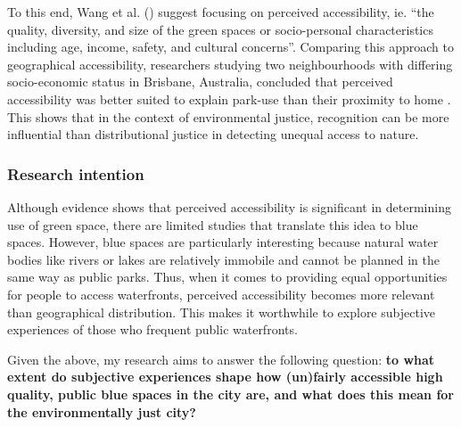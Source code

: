 \documentclass{article}
\begin{document}
To this end, Wang et al. (\citeyear{wang2015physical}) suggest focusing on perceived accessibility, ie. ``the quality, diversity, and size of the green spaces or socio-personal characteristics including age, income, safety, and cultural concerns''. Comparing this approach to geographical accessibility, researchers studying two neighbourhoods with differing socio-economic status in Brisbane, Australia, concluded that perceived accessibility was better suited to explain park-use than their proximity to home \parencite{wang2015comparison}.
This shows that in the context of environmental justice, recognition can be more influential than distributional justice in detecting unequal access to nature. 

\subsubsection{Research intention}

Although evidence shows that perceived accessibility is significant in determining use of green space, there are limited studies that translate this idea to blue spaces.
However, blue spaces are particularly interesting because natural water bodies like rivers or lakes are relatively immobile and cannot be planned in the same way as public parks. 
Thus, when it comes to providing equal opportunities for people to access waterfronts, perceived accessibility becomes more relevant than geographical distribution. 
This makes it worthwhile to explore subjective experiences of those who frequent public waterfronts.

Given the above, my research aims to answer the following question: \textbf{to what extent do subjective experiences shape how (un)fairly accessible high quality, public blue spaces in the city are, and what does this mean for the environmentally just city?}
\end{document}
